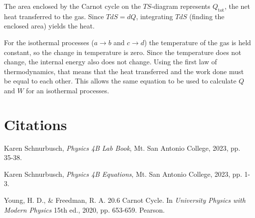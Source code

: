 \documentclass[12pt]{iopart} %
\begin{document}
The area enclosed by the Carnot cycle on the $TS$-diagram represents $Q_{\mathrm{tot}}$, the net heat transferred to the gas.
Since $T dS = dQ$, integrating $T dS$ (finding the enclosed area) yields the heat.

For the isothermal processes ($a \to b$ and $c \to d$) the temperature of the gas is held constant, so the change in temperature is zero.
Since the temperature does not change, the internal energy also does not change.
Using the first law of thermodynamics, that means that the heat transferred and the work done must be equal to each other.
This allows the same equation to be used to calculate $Q$ and $W$ for an isothermal processes.

\section{Citations}

\begin{thebibliography}{9}

  Karen Schnurbusch,
  \textit{Physics 4B Lab Book},
  Mt. San Antonio College,
  2023,
  pp. 35-38.

  Karen Schnurbusch,
  \textit{Physics 4B Equations},
  Mt. San Antonio College,
  2023,
  pp. 1-3.

  Young, H. D., \& Freedman, R. A.
  20.6 Carnot Cycle. In \textit{University Physics with Modern Physics} 15th ed.,
  2020,
  pp. 653-659.
  Pearson. 

\end{thebibliography}
\end{document}
